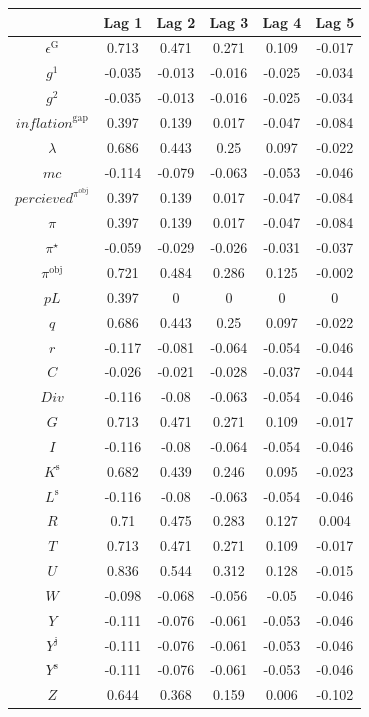 \begin{tabular}{c|ccccc|}
  & Lag 1 & Lag 2 & Lag 3 & Lag 4 & Lag 5\\
\hline
$\epsilon^{\mathrm{G}}$ & 0.713 & 0.471 & 0.271 & 0.109 & -0.017 \\
$g^{\mathrm{1}}$ & -0.035 & -0.013 & -0.016 & -0.025 & -0.034 \\
$g^{\mathrm{2}}$ & -0.035 & -0.013 & -0.016 & -0.025 & -0.034 \\
${i\!n\!f\!l\!a\!t\!i\!o\!n}^{\mathrm{gap}}$ & 0.397 & 0.139 & 0.017 & -0.047 & -0.084 \\
$\lambda$ & 0.686 & 0.443 & 0.25 & 0.097 & -0.022 \\
${m\!c}$ & -0.114 & -0.079 & -0.063 & -0.053 & -0.046 \\
${p\!e\!r\!c\!i\!e\!v\!e\!d}^{\pi^{\mathrm{obj}}}$ & 0.397 & 0.139 & 0.017 & -0.047 & -0.084 \\
$\pi$ & 0.397 & 0.139 & 0.017 & -0.047 & -0.084 \\
$\pi^{\star}$ & -0.059 & -0.029 & -0.026 & -0.031 & -0.037 \\
$\pi^{\mathrm{obj}}$ & 0.721 & 0.484 & 0.286 & 0.125 & -0.002 \\
${p\!L}$ & 0.397 & 0 & 0 & 0 & 0 \\
$q$ & 0.686 & 0.443 & 0.25 & 0.097 & -0.022 \\
$r$ & -0.117 & -0.081 & -0.064 & -0.054 & -0.046 \\
$C$ & -0.026 & -0.021 & -0.028 & -0.037 & -0.044 \\
${D\!i\!v}$ & -0.116 & -0.08 & -0.063 & -0.054 & -0.046 \\
$G$ & 0.713 & 0.471 & 0.271 & 0.109 & -0.017 \\
$I$ & -0.116 & -0.08 & -0.064 & -0.054 & -0.046 \\
$K^{\mathrm{s}}$ & 0.682 & 0.439 & 0.246 & 0.095 & -0.023 \\
$L^{\mathrm{s}}$ & -0.116 & -0.08 & -0.063 & -0.054 & -0.046 \\
$R$ & 0.71 & 0.475 & 0.283 & 0.127 & 0.004 \\
$T$ & 0.713 & 0.471 & 0.271 & 0.109 & -0.017 \\
$U$ & 0.836 & 0.544 & 0.312 & 0.128 & -0.015 \\
$W$ & -0.098 & -0.068 & -0.056 & -0.05 & -0.046 \\
$Y$ & -0.111 & -0.076 & -0.061 & -0.053 & -0.046 \\
$Y^{\mathrm{j}}$ & -0.111 & -0.076 & -0.061 & -0.053 & -0.046 \\
$Y^{\mathrm{s}}$ & -0.111 & -0.076 & -0.061 & -0.053 & -0.046 \\
$Z$ & 0.644 & 0.368 & 0.159 & 0.006 & -0.102 \\
\hline
\end{tabular}



